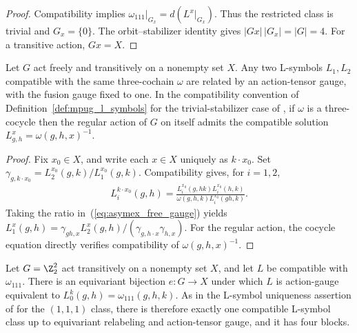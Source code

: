 \begin{proof}
    \leanok
    Compatibility implies $\omega_{111}|_{G_x}=d(L^x|_{G_x})$.
    Thus the restricted class is trivial and $G_x=\{0\}$.
    The orbit--stabilizer identity gives $|Gx|\,|G_x|=|G|=4$.
    For a transitive action, $Gx=X$.
\end{proof}


\begin{lemma}
    \label{thm:asymex_free_action_l_symbols}
    \leanok
    Let $G$ act freely and transitively on a nonempty set $X$.
    Any two L-symbols $L_1,L_2$ compatible with the same three-cochain
    $\omega$ are related by an action-tensor gauge, with the fusion gauge
    fixed to one. In the compatibility convention of
    Definition~\ref{def:mpug_l_symbols} for the trivial-stabilizer case of
    \cite[Section~4.1]{GarreRubio2023MPOSym}, if $\omega$ is a three-cocycle
    then the regular action of $G$ on itself admits the compatible solution
    $L^x_{g,h}=\omega(g,h,x)^{-1}$.
\end{lemma}

\begin{proof}
    \leanok
    Fix $x_0\in X$, and write each $x\in X$ uniquely as $k\cdot x_0$.
    Set $\gamma_{g,k\cdot x_0}=L_2^{x_0}(g,k)/L_1^{x_0}(g,k)$.
    Compatibility gives, for $i=1,2$,
    \begin{align}
        \label{eq:asymex_free_gauge}
        L_i^{k\cdot x_0}(g,h)
        =\frac{L_i^{x_0}(g,hk)L_i^{x_0}(h,k)}
        {\omega(g,h,k)L_i^{x_0}(gh,k)}.
    \end{align}
    Taking the ratio in~(\ref{eq:asymex_free_gauge}) yields
    $L_1^x(g,h)=\gamma_{gh,x}L_2^x(g,h)/
        (\gamma_{g,h\cdot x}\gamma_{h,x})$.
    For the regular action, the cocycle equation directly verifies
    compatibility of $\omega(g,h,x)^{-1}$.
\end{proof}

\begin{lemma}
    \label{thm:asymex_klein_four_block_uniqueness}
    \leanok
    Let $G=\Z_2^2$ act transitively on a nonempty set $X$, and let $L$
    be compatible with $\omega_{111}$.
    There is an equivariant bijection $e:G\to X$ under which $L$ is
    action-gauge equivalent to $L_0^k(g,h)=\omega_{111}(g,h,k)$.
    As in the L-symbol uniqueness assertion of
    \cite[Section~6]{GarreRubio2023MPOSym} for the $(1,1,1)$ class, there is
    therefore exactly one compatible L-symbol class up to equivariant
    relabeling and action-tensor gauge, and it has four blocks.
\end{lemma}

